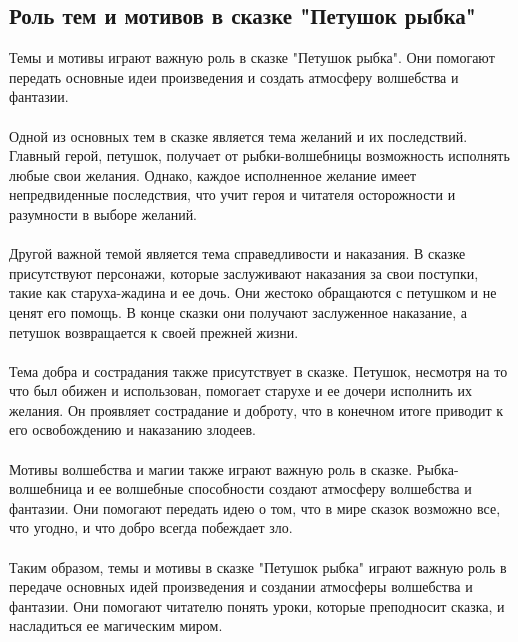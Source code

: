 \documentclass{article}
\begin{document}
\subsection{Роль тем и мотивов в сказке "{}{}Петушок рыбка"{}{}}
Темы и мотивы играют важную роль в сказке "{}{}Петушок рыбка"{}{}. Они помогают передать основные идеи произведения и создать атмосферу волшебства и фантазии.\\
~\\
Одной из основных тем в сказке является тема желаний и их последствий. Главный герой, петушок, получает от рыбки-волшебницы возможность исполнять любые свои желания. Однако, каждое исполненное желание имеет непредвиденные последствия, что учит героя и читателя осторожности и разумности в выборе желаний.\\
~\\
Другой важной темой является тема справедливости и наказания. В сказке присутствуют персонажи, которые заслуживают наказания за свои поступки, такие как старуха-жадина и ее дочь. Они жестоко обращаются с петушком и не ценят его помощь. В конце сказки они получают заслуженное наказание, а петушок возвращается к своей прежней жизни.\\
~\\
Тема добра и сострадания также присутствует в сказке. Петушок, несмотря на то что был обижен и использован, помогает старухе и ее дочери исполнить их желания. Он проявляет сострадание и доброту, что в конечном итоге приводит к его освобождению и наказанию злодеев.\\
~\\
Мотивы волшебства и магии также играют важную роль в сказке. Рыбка-волшебница и ее волшебные способности создают атмосферу волшебства и фантазии. Они помогают передать идею о том, что в мире сказок возможно все, что угодно, и что добро всегда побеждает зло.\\
~\\
Таким образом, темы и мотивы в сказке "{}{}Петушок рыбка"{}{} играют важную роль в передаче основных идей произведения и создании атмосферы волшебства и фантазии. Они помогают читателю понять уроки, которые преподносит сказка, и насладиться ее магическим миром.
\end{document}

